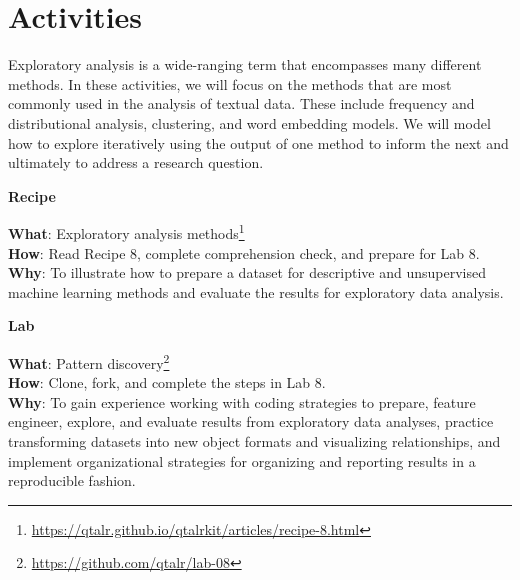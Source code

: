 \documentclass[
  letterpaper,
]{latex/krantz}
\theoremstyle{definition}
\theoremstyle{remark}
\DeclareRobustCommand{\href}[2]{#2\footnote{\url{#1}}}
\begin{document}
\section*{Activities}\label{activities-6}


Exploratory analysis is a wide-ranging term that encompasses many
different methods. In these activities, we will focus on the methods
that are most commonly used in the analysis of textual data. These
include frequency and distributional analysis, clustering, and word
embedding models. We will model how to explore iteratively using the
output of one method to inform the next and ultimately to address a
research question.

\begin{tcolorbox}[enhanced jigsaw, toprule=.15mm, breakable, colback=white, opacityback=0, leftrule=.75mm, bottomrule=.15mm, colframe=quarto-callout-color-frame, left=2mm, arc=.35mm, rightrule=.15mm]

\textbf{ Recipe}

\textbf{What}:
\href{https://qtalr.github.io/qtalrkit/articles/recipe-8.html}{Exploratory
analysis methods}\\
\textbf{How}: Read Recipe 8, complete comprehension check, and prepare
for Lab 8.\\
\textbf{Why}: To illustrate how to prepare a dataset for descriptive and
unsupervised machine learning methods and evaluate the results for
exploratory data analysis.

\end{tcolorbox}

\begin{tcolorbox}[enhanced jigsaw, toprule=.15mm, breakable, colback=white, opacityback=0, leftrule=.75mm, bottomrule=.15mm, colframe=quarto-callout-color-frame, left=2mm, arc=.35mm, rightrule=.15mm]

\textbf{ Lab}

\textbf{What}: \href{https://github.com/qtalr/lab-08}{Pattern
discovery}\\
\textbf{How}: Clone, fork, and complete the steps in Lab 8.\\
\textbf{Why}: To gain experience working with coding strategies to
prepare, feature engineer, explore, and evaluate results from
exploratory data analyses, practice transforming datasets into new
object formats and visualizing relationships, and implement
organizational strategies for organizing and reporting results in a
reproducible fashion.

\end{tcolorbox}
\end{document}
